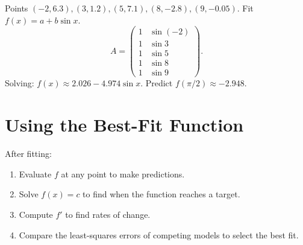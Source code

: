 \begin{example}
Points $(-2,6.3),(3,1.2),(5,7.1),(8,-2.8),(9,-0.05)$. Fit $f(x)=a+b\sin x$.
\[
A=\begin{pmatrix}1&\sin(-2)\\1&\sin3\\1&\sin5\\1&\sin8\\1&\sin9\end{pmatrix}.
\]
Solving: $f(x)\approx 2.026-4.974\sin x$. Predict $f(\pi/2)\approx-2.948$.
\end{example}

\section{Using the Best-Fit Function}

After fitting:
\begin{enumerate}
  \item Evaluate $f$ at any point to make predictions.
  \item Solve $f(x)=c$ to find when the function reaches a target.
  \item Compute $f'$ to find rates of change.
  \item Compare the least-squares errors of competing models to select the best fit.
\end{enumerate}
